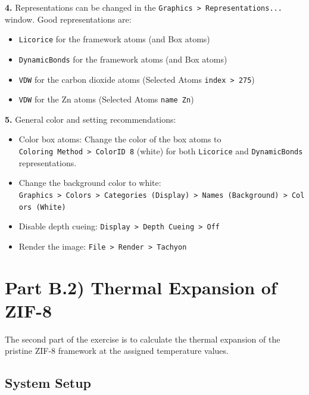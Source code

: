 \documentclass[
  letterpaper,
  DIV=11,
  numbers=noendperiod]{scrreprt}
\providecommand{\tightlist}{%
  \setlength{\itemsep}{0pt}\setlength{\parskip}{0pt}}\usepackage{longtable,booktabs,array}
\begin{document}
\textbf{4.} Representations can be changed in the
\texttt{Graphics\ \textgreater{}\ Representations...} window. Good
representations are:

\begin{itemize}
\tightlist
\item
  \texttt{Licorice} for the framework atoms (and Box atoms)
\item
  \texttt{DynamicBonds} for the framework atoms (and Box atoms)
\item
  \texttt{VDW} for the carbon dioxide atoms (Selected Atoms
  \texttt{index\ \textgreater{}\ 275})
\item
  \texttt{VDW} for the Zn atoms (Selected Atoms \texttt{name\ Zn})
\end{itemize}

\textbf{5.} General color and setting recommendations:

\begin{itemize}
\tightlist
\item
  Color box atoms: Change the color of the box atoms to
  \texttt{Coloring\ Method\ \textgreater{}\ ColorID\ 8} (white) for both
  \texttt{Licorice} and \texttt{DynamicBonds} representations.
\item
  Change the background color to white:
  \texttt{Graphics\ \textgreater{}\ Colors\ \textgreater{}\ Categories\ (Display)\ \textgreater{}\ Names\ (Background)\ \textgreater{}\ Colors\ (White)}
\item
  Disable depth cueing:
  \texttt{Display\ \textgreater{}\ Depth\ Cueing\ \textgreater{}\ Off}
\item
  Render the image:
  \texttt{File\ \textgreater{}\ Render\ \textgreater{}\ Tachyon}
\end{itemize}

\hypertarget{part-b.2-thermal-expansion-of-zif-8}{%
\chapter{Part B.2) Thermal Expansion of
ZIF-8}\label{part-b.2-thermal-expansion-of-zif-8}}

The second part of the exercise is to calculate the thermal expansion of
the pristine ZIF-8 framework at the assigned temperature values.

\hypertarget{system-setup-1}{%
\section*{System Setup}\label{system-setup-1}}
\end{document}

